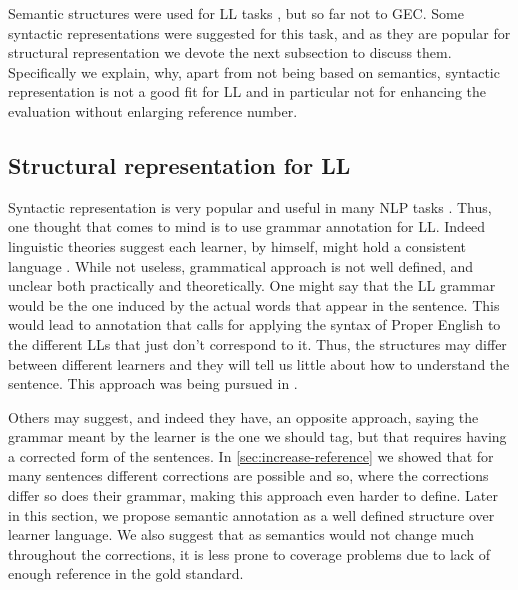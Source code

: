 \documentclass[letter,11pt]{article}
\begin{document}
Semantic structures were used for LL tasks \cite{king2013shallow}, but so far not to GEC. Some syntactic representations were suggested for this task, and as they are popular for structural representation we devote the next subsection to discuss them. Specifically we explain, why, apart from not being based on semantics, syntactic representation is not a good fit for LL and in particular not for enhancing the evaluation without enlarging reference number.

\subsection{Structural representation for LL}

Syntactic representation is very popular and useful in many NLP tasks 
\cite{mesfar2007named,ng2002improving,zollmann2006syntax}.
Thus, one thought that comes to mind is to use grammar annotation 
for LL. Indeed linguistic theories suggest each learner, by himself,
might hold a consistent 
language \cite{huebner1985system,tarone1983variability}.
While not useless, grammatical approach is not well
defined, and unclear both practically and theoretically. One might
say that the LL grammar would be the one induced by the actual words
that appear in the sentence. This would lead to annotation that calls
for applying the syntax of Proper English to the different LLs that just don't correspond to it. Thus, the structures may
differ between different learners and they will tell us little about
how to understand the sentence. This approach was being pursued in
\cite{berzak2016universal,ragheb2012defining}. 

Others may suggest, and indeed they have\cite{nagataphrase}, an opposite
approach, saying the grammar meant by the learner is the one we should
tag, but that requires having a corrected form of the sentences.
In \ref{sec:increase-reference} we showed that for many sentences different
corrections are possible and so, where the corrections differ so does their grammar,
making this approach even harder to define. Later in this
section, we propose semantic annotation as a well defined structure over learner language. We also suggest that as semantics would not change much throughout the corrections, it is less prone to coverage problems due to lack of enough reference in the gold standard.
\end{document}
